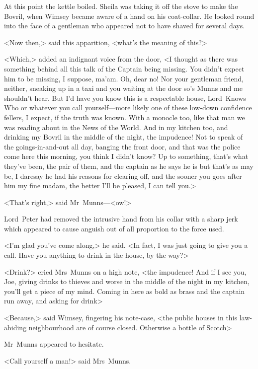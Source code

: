 At this point the kettle boiled. Sheila was taking it off the stove to make the Bovril, when Wimsey became aware of a hand on his coat-collar. He looked round into the face of a gentleman who appeared not to have shaved for several days.

<Now then,> said this apparition, <what's the meaning of this?>

<Which,> added an indignant voice from the door, <I thought as there was something behind all this talk of the Captain being missing. You didn't expect him to be missing, I suppose, ma'am. Oh, dear no! Nor your gentleman friend, neither, sneaking up in a taxi and you waiting at the door so's Munns and me shouldn't hear. But I'd have you know this is a respectable house, Lord~Knows Who or whatever you call yourself—more likely one of these low-down confidence fellers, I expect, if the truth was known. With a monocle too, like that man we was reading about in the News of the World. And in my kitchen too, and drinking my Bovril in the middle of the night, the impudence! Not to speak of the goings-in-and-out all day, banging the front door, and that was the police come here this morning, you think I didn't know? Up to something, that's what they've been, the pair of them, and the captain as he says he is but that's as may be, I daresay he had his reasons for clearing off, and the sooner you goes after him my fine madam, the better I'll be pleased, I can tell you.>

<That's right,> said Mr~Munns—<ow!>

Lord~Peter had removed the intrusive hand from his collar with a sharp jerk which appeared to cause anguish out of all proportion to the force used.

<I'm glad you've come along,> he said. <In fact, I was just going to give you a call. Have you anything to drink in the house, by the way?>

<Drink?> cried Mrs~Munns on a high note, <the impudence! And if I see you, Joe, giving drinks to thieves and worse in the middle of the night in my kitchen, you'll get a piece of my mind. Coming in here as bold as brass and the captain run away, and asking for drink\longdash>

<Because,> said Wimsey, fingering his note-case, <the public houses in this law-abiding neighbourhood are of course closed. Otherwise a bottle of Scotch\longdash>

Mr~Munns appeared to hesitate.

<Call yourself a man!> said Mrs~Munns.


